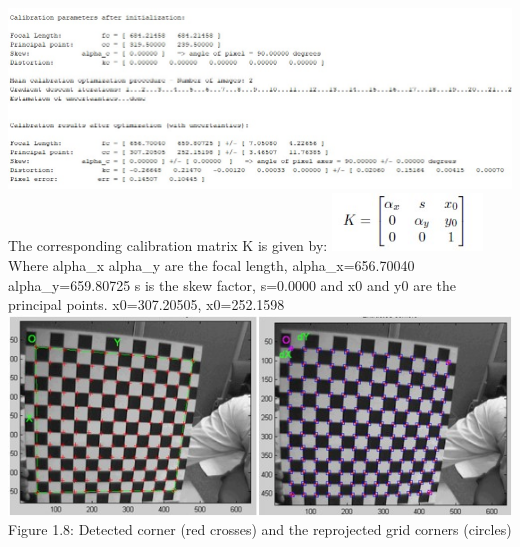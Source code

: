 \documentclass[a4paper, 12pt]{report}
\begin{document}
\newline
\includegraphics[width=1.2\textwidth]{resources/image/21.jpg} \newline
The corresponding calibration matrix K is given by: \newline
 \includegraphics[width=0.3\textwidth]{resources/image/22.jpg} \newline
Where alpha\_x alpha\_y are the focal length,  alpha\_x=656.70040   alpha\_y=659.80725 \newline
s is the skew factor, s=0.0000 \newline 
and x0 and y0 are the principal points. x0=307.20505, x0=252.1598
\newline 
\includegraphics[width=1.0\textwidth]{resources/image/9.jpg} \newline 
Figure 1.8: Detected corner (red crosses) and the reprojected grid corners (circles) \newline \newline 
\end{document}
